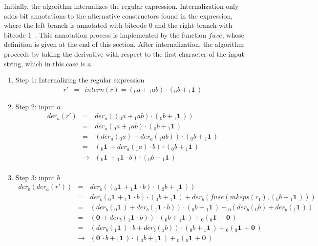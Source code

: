 \documentclass[12pt]{article}
\newcommand{\ZERO}{\textbf{0}}
\newcommand{\ONE}{\textbf{1}}
\newcommand{\der}{\textit{der}}
\newcommand{\fuse}{\textit{fuse}}
\newcommand{\mkeps}{\textit{mkeps}}
\newcommand{\intern}{\textit{intern}}
\begin{document}
Initially, the algorithm internalizes the regular expression.  
Internalization only adds bit annotations to the alternative constructors found in the expression, 
where the left branch is annotated with bitcode $0$ and the right branch with bitcode $1$~\cite{Sulzmann2014}.  
This annotation process is implemented by the function $\fuse$, whose definition is given at the end of this section.  
After internalization, the algorithm proceeds by taking the derivative with respect to the first character 
of the input string, which in this case is $a$.

\begin{enumerate}
  \item Step 1: Internalizing the regular expression
  \[
    \begin{array}{rcl}
    r' & = & \intern(r) = ({}_0a + {}_1ab) \cdot ({}_0b + {}_1\ONE\,)
    \end{array}
  \]

  \item Step 2: input $a$
    \[
    \begin{array}{rcl}
    \der_a (r') & =           & \der_a(({}_0a + {}_1ab) \cdot ({}_0b + {}_1\ONE\,))\\
                & =           & \der_a({}_0a + {}_1ab) \cdot ({}_0b + {}_1\ONE\,)\\
                & =           & (\der_a({}_0a) + \der_a({}_1ab)) \cdot ({}_0b + {}_1\ONE\,)\\
                & =           & ({}_0\ONE\, + \der_a({}_1a) \cdot b ) \cdot ({}_0b + {}_1\ONE\,)\\
                & \rightarrow & ({}_0\ONE\, + {}_1\ONE\, \cdot b) \cdot ({}_0b + {}_1\ONE\,)\\
    \end{array}
    \]

  \item Step 3: input $b$
  \[
    \begin{array}{rcl}
    \der_b(\der_a(r')) & =           & \der_b(({}_0\ONE\, + {}_1\ONE\, \cdot b) \cdot ({}_0b + {}_1\ONE\,))\\
                       & =           & \der_b({}_0\ONE\, + {}_1\ONE\, \cdot b) \cdot ({}_0b + {}_1\ONE\,) + \der_b(\fuse(\mkeps(r_1),({}_0b + {}_1\ONE\,))) \\
                       & =           & (\der_b({}_0\ONE\,) + \der_b({}_1\ONE\, \cdot b)) \cdot ({}_0b + {}_1\ONE\,) + {}_0(\der_b({}_0b) + \der_b({}_1\ONE\,)) \\
                       & =           & (\ZERO\, + \der_b({}_1\ONE\, \cdot b)) \cdot ({}_0b + {}_1\ONE\,) + {}_0({}_0\ONE\, + \ZERO\,) \\
                       & =           & (\der_b({}_1\ONE\,)\cdot b + \der_b({}_1b)) \cdot ({}_0b + {}_1\ONE\,) + {}_0({}_0\ONE\, + \ZERO\,) \\
                       & \rightarrow & (\ZERO\, \cdot b + {}_1\ONE\,) \cdot ({}_0b + {}_1\ONE\,) + {}_0({}_0\ONE\, + \ZERO\,) \\
    \end{array}
  \]

\end{enumerate}
\end{document}
